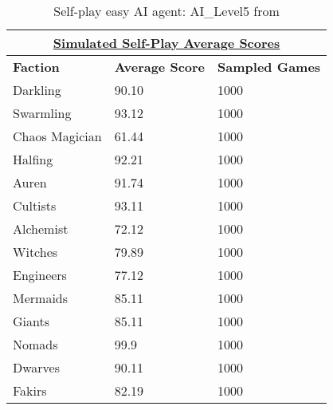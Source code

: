 \documentclass[10pt,twocolumn,letterpaper]{article}
\begin{document}
\begin{table}[h!]
\begin{tabular}{|l|l|l|}
\hline
\multicolumn{3}{|c|}{{\ul \textbf{Simulated Self-Play Average Scores}}}      \\ \hline
\textbf{Faction} & \textbf{Average Score} & \textbf{Sampled Games} \\ \hline
Darkling         & 90.10                 & 1000                   \\ \hline
Swarmling        & 93.12                 & 1000                   \\ \hline
Chaos Magician   & 61.44                 & 1000                   \\ \hline
Halfing          & 92.21                 & 1000                   \\ \hline
Auren            & 91.74                 & 1000                    \\ \hline
Cultists         & 93.11                 & 1000                    \\ \hline
Alchemist        & 72.12                 & 1000                   \\ \hline
Witches          & 79.89                 & 1000                   \\ \hline
Engineers        & 77.12                 & 1000                   \\ \hline
Mermaids         & 85.11                 & 1000                   \\ \hline
Giants           & 85.11                 & 1000                    \\ \hline
Nomads           & 99.9                 & 1000                   \\ \hline
Dwarves          & 90.11                 & 1000                   \\ \hline
Fakirs           & 82.19                 & 1000                    \\ \hline
\end{tabular}
\caption{Self-play easy AI agent: AI\_Level5 from \cite{TMStatsAI}}
\label{table:average_2p_score}
\end{table}

{\small


}
\end{document}
